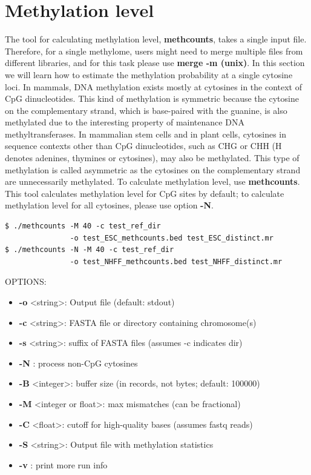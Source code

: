 \documentclass{article}
\begin{document}
\section{Methylation level}
\label{sec:estim-methyl-freq}
The tool for calculating methylation level, \textbf{methcounts}, 
takes a single input file. Therefore, for a single methylome, users 
might need to merge multiple files from different libraries, and for this 
task please use \textbf{merge -m (unix)}.
In this section we will learn how to estimate the methylation
probability at a single cytosine loci. In mammals, DNA methylation
exists mostly at cytosines in the context of CpG dinucleotides. This
kind of methylation is symmetric because the cytosine on the
complementary strand, which is base-paired with the guanine, is also
methylated due to the interesting property of maintenance DNA
methyltransferases. In mammalian stem cells and in plant
cells, cytosines in sequence contexts other than CpG dinucleotides,
such as CHG or CHH (H denotes adenines, thymines or cytosines), may also be
methylated. This type of methylation is called asymmetric as the
cytosines on the complementary strand are unnecessarily
methylated. To calculate methylation level, use \textbf{methcounts}. 
This tool calculates methylation level for CpG sites by default; to calculate
methylation level for all cytosines, please use option \textbf{-N}.
\begin{verbatim}
$ ./methcounts -M 40 -c test_ref_dir 
               -o test_ESC_methcounts.bed test_ESC_distinct.mr
$ ./methcounts -N -M 40 -c test_ref_dir 
               -o test_NHFF_methcounts.bed test_NHFF_distinct.mr
\end{verbatim}

OPTIONS:
\begin{itemize}
\item
\textbf{-o} \textless string\textgreater : Output file (default: stdout) 
\item
\textbf{-c} \textless string\textgreater : FASTA file or directory containing chromosome(s) 
\item
\textbf{-s} \textless string\textgreater : suffix of FASTA files (assumes -c indicates dir) 
\item
\textbf{-N} : process non-CpG cytosines 
\item
\textbf{-B} \textless integer\textgreater : buffer size (in records, not bytes; default: 100000) 
\item
\textbf{-M} \textless integer or float\textgreater : max mismatches (can be fractional) 
\item
\textbf{-C} \textless float\textgreater : cutoff for high-quality bases (assumes fastq reads) 
\item
\textbf{-S} \textless string\textgreater : Output file with methylation statistics 
\item
\textbf{-v} : print more run info 
\end{itemize}
\end{document}
